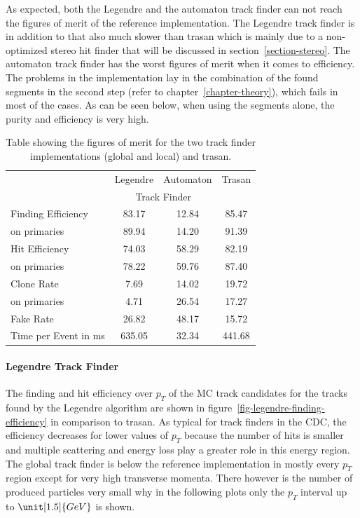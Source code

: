 As expected, both the Legendre and the automaton track finder can not reach the figures of merit of the reference implementation. The Legendre track finder is in addition to that also much slower than trasan which is mainly due to a non-optimized stereo hit finder that will be discussed in section~\ref{section-stereo}. The automaton track finder has the worst figures of merit when it comes to efficiency. The problems in the implementation lay in the combination of the found segments in the second step (refer to chapter~\ref{chapter-theory}), which fails in most of the cases. As can be seen below, when using the segments alone, the purity and efficiency is very high.

\begin{table}
  \caption{Table showing the figures of merit for the two track finder implementations (global and local) and trasan.}
  \centering
  \begin{tabular}{lccc} \toprule
    & Legendre & Automaton & Trasan \\ 
    & \multicolumn{2}{c}{Track Finder} & \\ \midrule
    Finding Efficiency & 83.17 & 12.84 & 85.47 \\
    \quad on primaries & 89.94 & 14.20 & 91.39 \\ 
    Hit Efficiency     & 74.03 & 58.29 & 82.19 \\
    \quad on primaries & 78.22 & 59.76 & 87.40 \\ 
    Clone Rate         & 7.69  & 14.02 & 19.72 \\
    \quad on primaries & 4.71  & 26.54 & 17.27 \\ 
    Fake Rate          & 26.82 & 48.17 & 15.72 \\ 
    Time per Event in ms & 635.05 & 32.34 & 441.68 \\ \bottomrule
  \end{tabular}
  \label{tab-old-implementation-results}
\end{table}

\paragraph{Legendre Track Finder}
The finding and hit efficiency over $p_T$ of the MC track candidates for the tracks found by the Legendre algorithm are shown in figure~\ref{fig-legendre-finding-efficiency} in comparison to trasan. As typical for track finders in the CDC, the efficiency decreases for lower values of $p_T$ because the number of hits is smaller and multiple scattering and energy loss play a greater role in this energy region. The global track finder is below the reference implementation in mostly every $p_T$ region except for very high transverse momenta. There however is the number of produced particles very small why in the following plots only the $p_T$ interval up to $\unit[1.5]{GeV}$ is shown.

